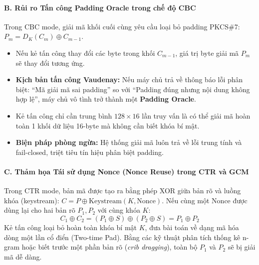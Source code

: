 \documentclass[12pt, a4paper]{report}
\begin{document}
\paragraph{B. Rủi ro Tấn công Padding Oracle trong chế độ CBC}
Trong CBC mode, giải mã khối cuối cùng yêu cầu loại bỏ padding PKCS\#7: $P_m = D_K(C_m) \oplus C_{m-1}$.
\begin{itemize}
    \item Nếu kẻ tấn công thay đổi các byte trong khối $C_{m-1}$, giá trị byte giải mã $P_m$ sẽ thay đổi tương ứng.
    \item \textbf{Kịch bản tấn công Vaudenay:} Nếu máy chủ trả về thông báo lỗi phân biệt: ``Mã giải mã sai padding'' so với ``Padding đúng nhưng nội dung không hợp lệ'', máy chủ vô tình trở thành một \textbf{Padding Oracle}.
    \item Kẻ tấn công chỉ cần trung bình $128 \times 16$ lần truy vấn là có thể giải mã hoàn toàn 1 khối dữ liệu 16-byte mà không cần biết khóa bí mật.
    \item \textbf{Biện pháp phòng ngừa:} Hệ thống giải mã luôn trả về lỗi trung tính và fail-closed, triệt tiêu tín hiệu phân biệt padding.
\end{itemize}

\paragraph{C. Thảm họa Tái sử dụng Nonce (Nonce Reuse) trong CTR và GCM}
Trong CTR mode, bản mã được tạo ra bằng phép XOR giữa bản rõ và luồng khóa (keystream): $C = P \oplus \text{Keystream}(K, \text{Nonce})$. Nếu cùng một Nonce được dùng lại cho hai bản rõ $P_1, P_2$ với cùng khóa $K$:
\[ C_1 \oplus C_2 = (P_1 \oplus S) \oplus (P_2 \oplus S) = P_1 \oplus P_2 \]
Kẻ tấn công loại bỏ hoàn toàn khóa bí mật $K$, đưa bài toán về dạng mã hóa dòng một lần cổ điển (Two-time Pad). Bằng các kỹ thuật phân tích thống kê n-gram hoặc biết trước một phần bản rõ (\textit{crib dragging}), toàn bộ $P_1$ và $P_2$ sẽ bị giải mã dễ dàng.
\end{document}
